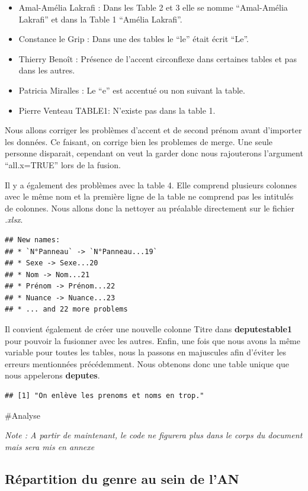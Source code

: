\documentclass[]{article}
\providecommand{\tightlist}{%
  \setlength{\itemsep}{0pt}\setlength{\parskip}{0pt}}
\begin{document}
\begin{itemize}
\tightlist
\item
  Amal-Amélia Lakrafi : Dans les Table 2 et 3 elle se nomme
  ``Amal-Amélia Lakrafi'' et dans la Table 1 ``Amélia Lakrafi''.
\item
  Constance le Grip : Dans une des tables le ``le'' était écrit ``Le''.
\item
  Thierry Benoît : Présence de l'accent circonflexe dans certaines
  tables et pas dans les autres.
\item
  Patricia Miralles : Le ``e'' est accentué ou non suivant la table.
\item
  Pierre Venteau TABLE1: N'existe pas dans la table 1.
\end{itemize}

Nous allons corriger les problèmes d'accent et de second prénom avant
d'importer les données. Ce faisant, on corrige bien les problemes de
merge. Une seule personne disparait, cependant on veut la garder donc
nous rajouterons l'argument ``all.x=TRUE'' lors de la fusion.

Il y a également des problèmes avec la table 4. Elle comprend plusieurs
colonnes avec le même nom et la première ligne de la table ne comprend
pas les intitulés de colonnes. Nous allons donc la nettoyer au préalable
directement sur le fichier \emph{.xlsx}.

\begin{verbatim}
## New names:
## * `N°Panneau` -> `N°Panneau...19`
## * Sexe -> Sexe...20
## * Nom -> Nom...21
## * Prénom -> Prénom...22
## * Nuance -> Nuance...23
## * ... and 22 more problems
\end{verbatim}

Il convient également de créer une nouvelle colonne Titre dans
\textbf{deputestable1} pour pouvoir la fusionner avec les autres. Enfin,
une fois que nous avons la même variable pour toutes les tables, nous la
passons en majuscules afin d'éviter les erreurs mentionnées
précédemment. Nous obtenons donc une table unique que nous appelerons
\textbf{deputes}.

\begin{verbatim}
## [1] "On enlève les prenoms et noms en trop."
\end{verbatim}

\#Analyse

\emph{Note : A partir de maintenant, le code ne figurera plus dans le
corps du document mais sera mis en annexe}

\hypertarget{ruxe9partition-du-genre-au-sein-de-lan}{%
\subsection{Répartition du genre au sein de
l'AN}\label{ruxe9partition-du-genre-au-sein-de-lan}}
\end{document}
